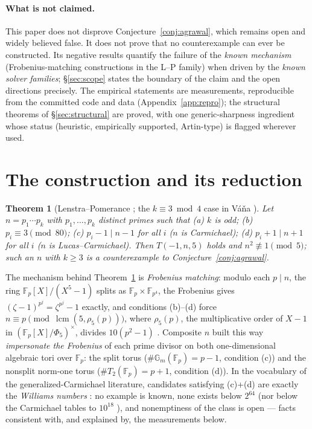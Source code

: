 \documentclass[11pt]{article}
\newtheorem{theorem}{Theorem}[section]
\theoremstyle{remark}
\newcommand{\F}{\mathbb{F}}
\DeclareMathOperator{\lcm}{lcm}
\begin{document}
\paragraph{What is not claimed.} This paper does not disprove
Conjecture~\ref{conj:agrawal}, which remains open and widely believed
false. It does not prove that no counterexample can ever be constructed.
Its negative results quantify the failure of the \emph{known mechanism}
(Frobenius-matching constructions in the L--P family) when driven by the
\emph{known solver families}; \S\ref{sec:scope} states the boundary of the
claim and the open directions precisely. The empirical statements are
measurements, reproducible from the committed code and data
(Appendix~\ref{app:repro}); the structural theorems of
\S\ref{sec:structural} are proved, with one generic-sharpness ingredient
whose status (heuristic, empirically supported, Artin-type) is flagged
wherever used.

\section{The construction and its reduction}\label{sec:reduction}

\begin{theorem}[Lenstra--Pomerance \cite{LPremarks}; the $k \equiv 3 \bmod
4$ case in V\'a\v{n}a \cite{Vana09}]\label{thm:lp}
Let $n = p_1 \cdots p_k$ with $p_1, \dots, p_k$ distinct primes such that
\emph{(a)} $k$ is odd; \emph{(b)} $p_i \equiv 3 \pmod{80}$;
\emph{(c)} $p_i - 1 \mid n - 1$ for all $i$ ($n$ is Carmichael);
\emph{(d)} $p_i + 1 \mid n + 1$ for all $i$ ($n$ is Lucas--Carmichael).
Then $T(-1,n,5)$ holds and $n^2 \not\equiv 1 \pmod 5$; such an $n$ with
$k \ge 3$ is a counterexample to Conjecture~\ref{conj:agrawal}.
\end{theorem}

The mechanism behind Theorem~\ref{thm:lp} is \emph{Frobenius matching}:
modulo each $p \mid n$, the ring $\F_p[X]/(X^5-1)$ splits as $\F_p \times
\F_{p^4}$, the Frobenius gives $(\zeta - 1)^{p^j} = \zeta^{p^j} - 1$
exactly, and conditions (b)--(d) force $n \equiv p \pmod{\lcm(5,
\rho_5(p))}$, where $\rho_5(p)$, the multiplicative order of $X - 1$ in
$(\F_p[X]/\Phi_5)^\times$, divides $10(p^2 - 1)$ \cite{Vana09}. Composite
$n$ built this way \emph{impersonate the Frobenius} of each prime divisor
on both one-dimensional algebraic tori over $\F_p$: the split torus
($\#\mathbb{G}_m(\F_p) = p - 1$, condition (c)) and the nonsplit norm-one
torus ($\#T_2(\F_p) = p + 1$, condition (d)). In the vocabulary of the
generalized-Carmichael literature, candidates satisfying (c)+(d) are
exactly the \emph{Williams numbers} \cite{Williams77,Echi07}: no example
is known, none exists below $2^{64}$ \cite{McIntoshMitra} (nor below the
Carmichael tables to $10^{18}$ \cite{Pinch}), and
nonemptiness of the class is open --- facts consistent with, and explained
by, the measurements below.
\end{document}

